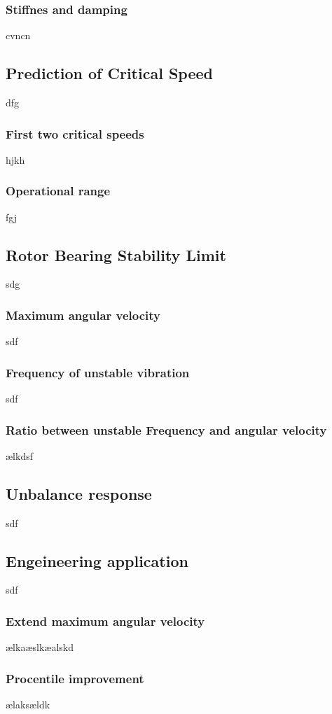 \subsubsection{Stiffnes and damping}
cvncn
\subsection{Prediction of Critical Speed}
dfg
\subsubsection{First two critical speeds}
hjkh
\subsubsection{Operational range}
fgj
\subsection{Rotor Bearing Stability Limit}
sdg
\subsubsection{Maximum angular velocity}
sdf
\subsubsection{Frequency of unstable vibration}
sdf
\subsubsection{Ratio between unstable Frequency and angular velocity}
ælkdsf
\subsection{Unbalance response}
sdf
\subsection{Engeineering application}
sdf
\subsubsection{Extend maximum angular velocity}
ælkaæslkæalskd
\subsubsection{Procentile improvement}
ælaksældk